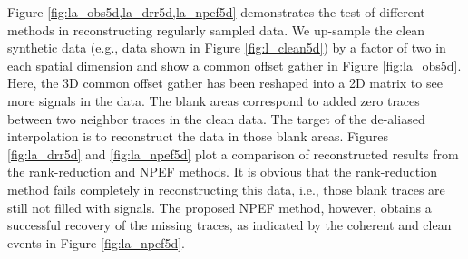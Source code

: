 Figure \ref{fig:la_obs5d,la_drr5d,la_npef5d} demonstrates the test of different methods in reconstructing regularly sampled data. %
We up-sample the clean synthetic data (e.g., data shown in Figure \ref{fig:l_clean5d}) by a factor of two in each spatial dimension and show a common offset gather in Figure \ref{fig:la_obs5d}. Here, the 3D common offset gather has been reshaped into a 2D matrix to see more signals in the data. The blank areas correspond to added zero traces between two neighbor traces in the clean data. The target of the de-aliased interpolation is to reconstruct the data in those blank areas. Figures \ref{fig:la_drr5d} and \ref{fig:la_npef5d} plot a comparison of reconstructed results from the rank-reduction and NPEF methods. It is obvious that the rank-reduction method fails completely in reconstructing this data, i.e., those blank traces are still not filled with signals. The proposed NPEF method, however, obtains a successful recovery of the missing traces, as indicated by the coherent and clean events in Figure \ref{fig:la_npef5d}. 

